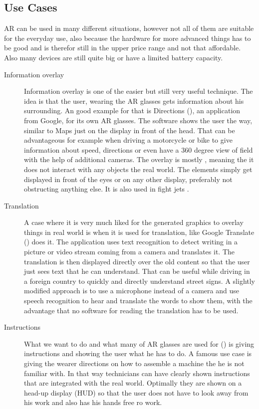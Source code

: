 \documentclass[11pt,a4paper]{article}
\begin{document}
	\subsection{Use Cases}
	AR can be used in many different situations, however not all of them are suitable for the everyday use, also because the hardware for more advanced things has to be good and is therefor still in the upper price range and not that affordable. Also many devices are still quite big or have a limited battery capacity.
	\begin{description}
		\item[Information overlay]  
		Information overlay is one of the easier but still very useful technique. The idea is that the user, wearing the AR glasses gets information about his surrounding. An good example for that is Directions (), an application from Google, for its own AR glasses. The software shows the user the way, similar to Maps just on the display in front of the head. That can be advantageous for example when driving a motorcycle or bike to give information about speed, directions or even have a 360 degree view of field with the help of additional cameras. The overlay is mostly , meaning the it does not interact with any objects the real world. The elements simply get displayed in front of the eyes or on any other display, preferably not obstructing anything else. It is also used in fight jets .
		\item[Translation]
		A case where it is very much liked for the  generated graphics to overlay things in real world is when it is used for translation, like Google Translate () does it. The application uses text recognition to detect writing in a picture or video stream coming from a camera and translates it. The translation is then displayed directly over the old content so that the user just sees text that he can understand. That can be useful while driving in a foreign country to quickly and directly understand street signs. A slightly modified approach is to use a microphone instead of a camera and use speech recognition to hear and translate the words to show them, with the advantage that no software for reading the translation has to be used.
		\item[Instructions]
		What we want to do and what many of AR glasses are used for () is giving instructions and showing the user what he has to do. A famous use case is giving the wearer directions on how to assemble a machine the he is not familiar with. In that way technicians can have clearly shown instructions that are integrated with the real world. Optimally they are shown on a head-up display (HUD) so that the user does not have to look away from his work and also has his hands free ro work.

\end{description}
\end{document}
